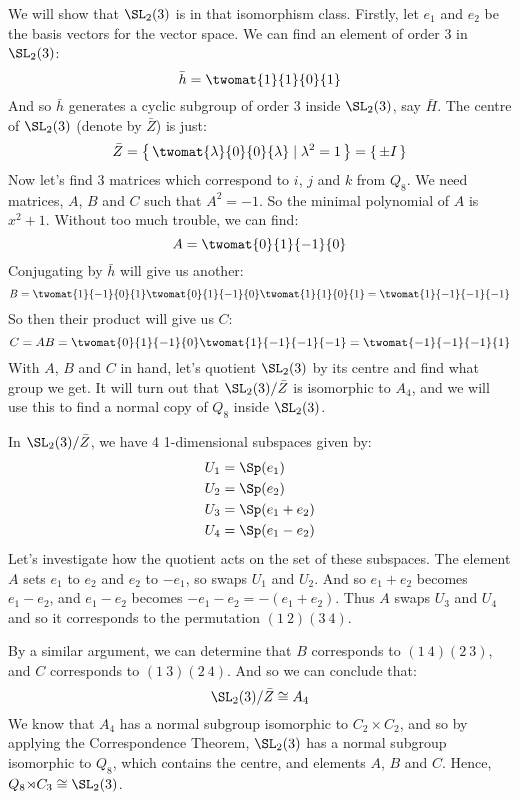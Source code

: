\begin{enumerate}
        We will show that \(\SL_2(3)\) is in that isomorphism class.
        Firstly, let \(e_1\) and \(e_2\) be the basis vectors for the vector space.
        We can find an element of order 3 in \(\SL_2(3)\):
        \[\bar{h} = \twomat{1}{1}{0}{1}\]
        And so \(\bar{h}\) generates a cyclic subgroup of order 3 inside \(\SL_2(3)\), say \(\bar{H}\).
        The centre of \(\SL_2(3)\) (denote by \(\bar{Z}\)) is just:
        \[ \bar{Z} = \left\{\,\twomat{\lambda}{0}{0}{\lambda} \mid \lambda^2 = 1\,\right\} = \{\,\pm I\,\} \]
        Now let's find 3 matrices which correspond to \(i\), \(j\) and \(k\) from \(Q_8\).
        We need matrices, \(A\), \(B\) and \(C\) such that \(A^2 = -1\).
        So the minimal polynomial of \(A\) is \(x^2 + 1\).
        Without too much trouble, we can find:
        \[ A = \twomat{0}{1}{-1}{0} \]
        Conjugating by \(\bar{h}\) will give us another:
        \[ B = \twomat{1}{-1}{0}{1}\twomat{0}{1}{-1}{0}\twomat{1}{1}{0}{1} = \twomat{1}{-1}{-1}{-1} \]
        So then their product will give us \(C\):
        \[ C = AB = \twomat{0}{1}{-1}{0}\twomat{1}{-1}{-1}{-1} = \twomat{-1}{-1}{-1}{1} \]
        With \(A\), \(B\) and \(C\) in hand, let's quotient \(\SL_2(3)\) by its centre and find what group we get.
        It will turn out that \(\SL_2(3)/\bar{Z}\) is isomorphic to \(A_4\), and we will use this to find a normal copy of
        \(Q_8\) inside \(\SL_2(3)\).

        In \(\SL_2(3)/\bar{Z}\), we have 4 1-dimensional subspaces given by:
        \begin{align*}
            U_1 &= \Sp(e_1) \\
            U_2 &= \Sp(e_2) \\
            U_3 &= \Sp(e_1 + e_2) \\
            U_4 &= \Sp(e_1 - e_2)
        \end{align*}
        Let's investigate how the quotient acts on the set of these subspaces.
        The element \(A\) sets \(e_1\) to \(e_2\) and \(e_2\) to \(-e_1\), so swaps \(U_1\) and \(U_2\).
        And so \(e_1 + e_2\) becomes \(e_1 - e_2\), and \(e_1 - e_2\) becomes \(-e_1 - e_2 = -(e_1 + e_2)\).
        Thus \(A\) swaps \(U_{3}\) and \(U_4\) and so it corresponds to the permutation \((1\ 2)(3\ 4)\).

        By a similar argument, we can determine that \(B\) corresponds to \((1\ 4)(2\ 3)\), and \(C\) corresponds to
        \((1\ 3)(2\ 4)\).
        And so we can conclude that:
        \[\SL_2(3)/\bar{Z} \cong A_4\]
        We know that \(A_4\) has a normal subgroup isomorphic to \(C_2 {\times} C_{2}\), and so by applying the
        Correspondence Theorem, \(\SL_2(3)\) has a normal subgroup isomorphic to \(Q_8\), which contains the centre, and
        elements \(A\), \(B\) and \(C\).
        Hence, \(Q_8 {\rtimes} C_3 \cong \SL_2(3)\).
\end{enumerate}

